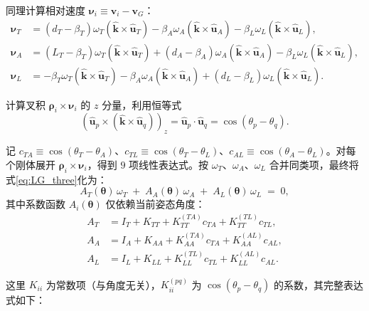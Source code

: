 \documentclass{article}
\begin{document}
同理计算相对速度 $\boldsymbol{\nu}_i \equiv \mathbf{v}_i - \mathbf{v}_G$：
\begin{align}
\boldsymbol{\nu}_T &= (d_T - \beta_T)\omega_T(\hat{\mathbf{k}}\times\hat{\mathbf{u}}_T)
                   - \beta_A\omega_A(\hat{\mathbf{k}}\times\hat{\mathbf{u}}_A)
                   - \beta_L\omega_L(\hat{\mathbf{k}}\times\hat{\mathbf{u}}_L), \label{eq:nuT} \\
\boldsymbol{\nu}_A &= (L_T - \beta_T)\omega_T(\hat{\mathbf{k}}\times\hat{\mathbf{u}}_T)
                   + (d_A - \beta_A)\omega_A(\hat{\mathbf{k}}\times\hat{\mathbf{u}}_A)
                   - \beta_L\omega_L(\hat{\mathbf{k}}\times\hat{\mathbf{u}}_L), \label{eq:nuA} \\
\boldsymbol{\nu}_L &= -\beta_T\omega_T(\hat{\mathbf{k}}\times\hat{\mathbf{u}}_T)
                   - \beta_A\omega_A(\hat{\mathbf{k}}\times\hat{\mathbf{u}}_A)
                   + (d_L - \beta_L)\omega_L(\hat{\mathbf{k}}\times\hat{\mathbf{u}}_L). \label{eq:nuL}
\end{align}

计算叉积 $\boldsymbol{\rho}_i \times \boldsymbol{\nu}_i$ 的 $z$ 分量，利用恒等式
\[
(\hat{\mathbf{u}}_p \times (\hat{\mathbf{k}}\times\hat{\mathbf{u}}_q))_z = \hat{\mathbf{u}}_p\cdot\hat{\mathbf{u}}_q = \cos(\theta_p - \theta_q).
\]

记 $c_{TA} \equiv \cos(\theta_T-\theta_A)$、$c_{TL} \equiv \cos(\theta_T-\theta_L)$、$c_{AL} \equiv \cos(\theta_A-\theta_L)$。对每个刚体展开 $\boldsymbol{\rho}_i \times \boldsymbol{\nu}_i$，得到 $9$ 项线性表达式。按 $\omega_T$、$\omega_A$、$\omega_L$ 合并同类项，最终将式\eqref{eq:LG_three}化为：
\begin{equation}
\boxed{A_T(\boldsymbol{\theta})\,\omega_T \;+\; A_A(\boldsymbol{\theta})\,\omega_A \;+\; A_L(\boldsymbol{\theta})\,\omega_L \;=\; 0}, \label{eq:three_body_am}
\end{equation}
其中系数函数 $A_i(\boldsymbol{\theta})$ 仅依赖当前姿态角度：
\begin{align}
A_T &= I_T + K_{TT} + K_{TT}^{(TA)} c_{TA} + K_{TT}^{(TL)} c_{TL}, \label{eq:AT} \\
A_A &= I_A + K_{AA} + K_{AA}^{(TA)} c_{TA} + K_{AA}^{(AL)} c_{AL}, \label{eq:AA} \\
A_L &= I_L + K_{LL} + K_{LL}^{(TL)} c_{TL} + K_{LL}^{(AL)} c_{AL}. \label{eq:AL}
\end{align}

这里 $K_{ii}$ 为常数项（与角度无关），$K_{ii}^{(pq)}$ 为 $\cos(\theta_p-\theta_q)$ 的系数，其完整表达式如下：
\end{document}
